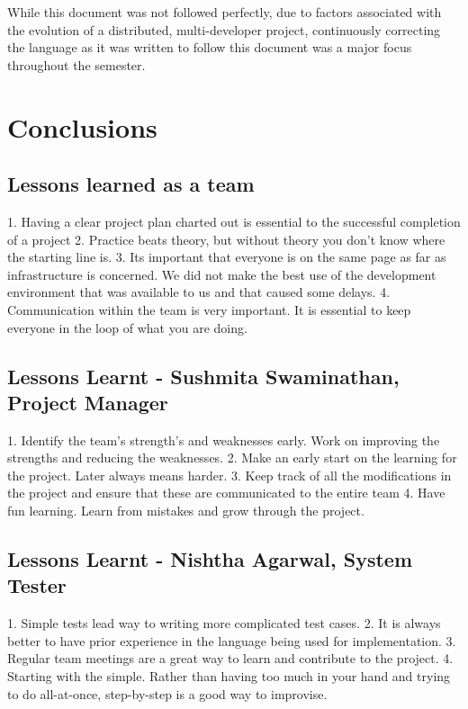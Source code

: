 \documentclass[letterpaper,11pt]{article}
\begin{document}
{While this document was not followed perfectly, due to factors associated with the evolution of a distributed, multi-developer project, continuously correcting the language as it was written to follow this document was a major focus throughout the semester.

\section{Conclusions}

\subsection{Lessons learned as a team}
1. Having a clear project plan charted out is essential to the successful completion of a project
2. Practice beats theory, but without theory you don't know where the starting line is.
3. Its important that everyone is on the same page as far as infrastructure is concerned. We did not make the best use of the development environment
that was available to us and that caused some delays.
4. Communication within the team is very important. It is essential to keep everyone in the loop of what you are doing.

\subsection{Lessons Learnt - Sushmita Swaminathan, Project Manager}

1. Identify the team's strength's and weaknesses early. Work on improving the strengths and reducing the weaknesses.
2. Make an early start on the learning for the project. Later always means harder.
3. Keep track of all the modifications in the project and ensure that these are communicated to the entire team
4. Have fun learning. Learn from mistakes and grow through the project.

\subsection{Lessons Learnt - Nishtha Agarwal, System Tester}

1. Simple tests lead way to writing more complicated test cases. 
2. It is always better to have prior experience in the language being used for implementation.
3. Regular team meetings are a great way to learn and contribute to the project.
4. Starting with the simple. Rather than having too much in your hand and trying to do all-at-once, step-by-step is a good way to improvise. 

}
\end{document}
